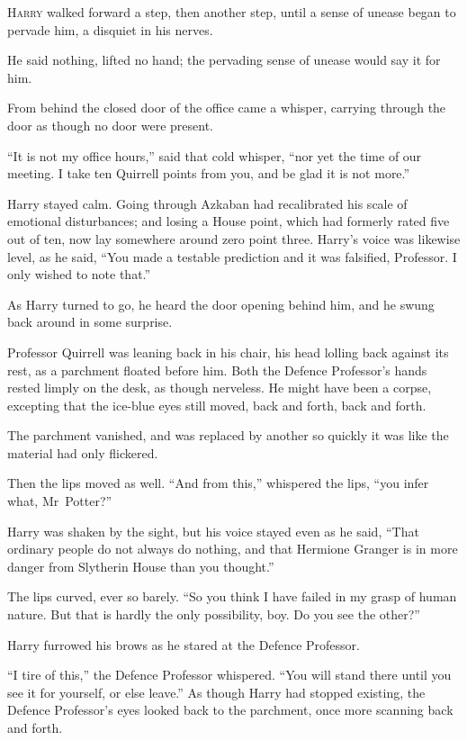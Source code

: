 
\lettrine{H}{arry} walked
forward a step, then another step, until a sense of unease began to pervade him, a disquiet in his nerves.

He said nothing, lifted no hand; the pervading sense of unease would say it for him.

From behind the closed door of the office came a whisper, carrying through the door as though no door were present.

“It is not my office hours,” said that cold whisper, “nor yet the time of our meeting. I take ten Quirrell points from you, and be glad it is not more.”

Harry stayed calm. Going through Azkaban had recalibrated his scale of emotional disturbances; and losing a House point, which had formerly rated five out of ten, now lay somewhere around zero point three. Harry’s voice was likewise level, as he said, “You made a testable prediction and it was falsified, Professor. I only wished to note that.”

As Harry turned to go, he heard the door opening behind him, and he swung back around in some surprise.

Professor Quirrell was leaning back in his chair, his head lolling back against its rest, as a parchment floated before him. Both the Defence Professor’s hands rested limply on the desk, as though nerveless. He might have been a corpse, excepting that the ice-blue eyes still moved, back and forth, back and forth.

The parchment vanished, and was replaced by another so quickly it was like the material had only flickered.

Then the lips moved as well. “And from this,” whispered the lips, “you infer what, Mr~Potter?”

Harry was shaken by the sight, but his voice stayed even as he said, “That ordinary people do not always do nothing, and that Hermione Granger is in more danger from Slytherin House than you thought.”

The lips curved, ever so barely. “So you think I have failed in my grasp of human nature. But that is hardly the only possibility, boy. Do you see the other?”

Harry furrowed his brows as he stared at the Defence Professor.

“I tire of this,” the Defence Professor whispered. “You will stand there until you see it for yourself, or else leave.” As though Harry had stopped existing, the Defence Professor’s eyes looked back to the parchment, once more scanning back and forth.

